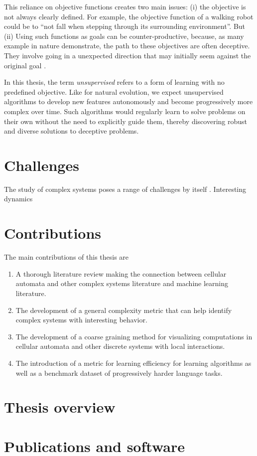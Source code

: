 This reliance on objective functions creates two main issues: (i) the objective
is not always clearly defined. For example, the objective function of a walking
robot could be to ``not fall when stepping through its surrounding
environment''. But (ii) Using such functions as goals can be counter-productive,
because, as many example in nature demonstrate, the path to these objectives are
often deceptive. They involve going in a unexpected direction that may initially
seem against the original goal \cite{stanleyWhyGreatnessCannot2015}.

In this thesis, the term \emph{unsupervised} refers to a form of learning with
no predefined objective. Like for natural evolution, we expect unsupervised
algorithms to develop new features autonomously and become progressively more
complex over time. Such algorithms would regularly learn to solve problems on
their own without the need to explicitly guide them, thereby discovering robust
and diverse solutions to deceptive problems.


\section{Challenges}

The study of complex systems poses a range of challenges by itself \cite{sanmiguelChallengesComplexSystems2012}. Interesting
dynamics

\section{Contributions}

The main contributions of this thesis are
\begin{enumerate}
  \item A thorough literature review making the connection between cellular
        automata and other complex systems literature and machine learning
        literature.

  \item The development of a general complexity metric that can help identify
  complex systems with interesting behavior.

  \item The development of a coarse graining method for visualizing computations
        in cellular automata and other discrete systems with local interactions.

  \item The introduction of a metric for learning efficiency for learning
        algorithms as well as a benchmark dataset of progressively harder
        language tasks.
\end{enumerate}

\section{Thesis overview}

\section{Publications and software}
